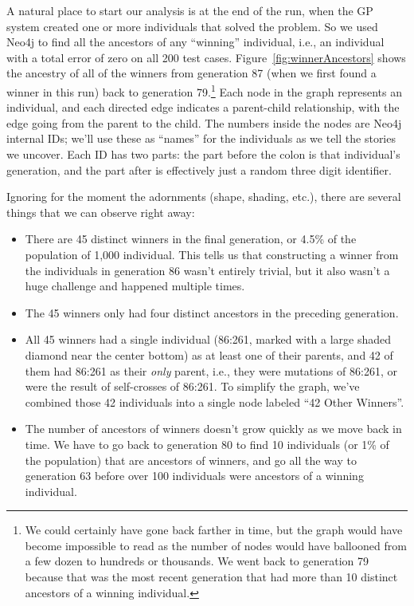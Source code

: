 A natural place to start our analysis is at the end of the run, when the GP system created one or more individuals that 
solved the problem. So we used Neo4j to find all the ancestors of any ``winning'' individual, i.e., an individual 
with a total error of zero
on all 200 test cases.
Figure~\ref{fig:winnerAncestors} shows the ancestry of all of the winners from generation 87 
(when we first found a winner in this run) back to generation 79.\footnote{We could certainly 
	have gone back farther in time, but the graph would have become impossible to read as the
	number of nodes would have ballooned from a few dozen to hundreds or thousands. We went
	back to generation 79 because that was the most recent generation that had more than 10
	distinct ancestors of a winning individual.}
Each node in the graph represents an individual, and each directed edge indicates a parent-child
relationship, with the edge going from the parent to the child. The numbers inside the nodes are
Neo4j internal IDs; we'll use these as ``names'' for the individuals as we tell the stories 
we uncover. Each ID has two parts:
the part before the colon is that individual's generation, and the part after is effectively
just a random three digit identifier.

Ignoring for the moment the adornments (shape, shading, etc.), there are several things that
we can observe right away:
\begin{itemize}
	\item There are 45 distinct winners in the final generation, or 4.5\% of the population of
	1,000 individual. This tells us that constructing a winner from the individuals in generation 86
	wasn't entirely trivial, but it also wasn't a huge challenge and happened multiple times.
	\item The 45 winners only had four distinct ancestors in the preceding generation.
	\item All 45 winners had a single individual (86:261, marked with a large shaded diamond near
	the center bottom) as at least one of their parents, and 42 of
	them had 86:261 as their \emph{only} parent, i.e., they were mutations of 86:261, or were the result
	of self-crosses of 86:261. To simplify the graph, we've combined those 42 individuals into a
	single node labeled ``42 Other Winners''.
	\item The number of ancestors of winners doesn't grow quickly as we move back in time. We have to
	go back to generation 80 to find 10 individuals (or 1\% of the population) that are ancestors of
	winners, and go all the way to generation 63 before over 100 individuals were ancestors of a winning individual.
\end{itemize}

